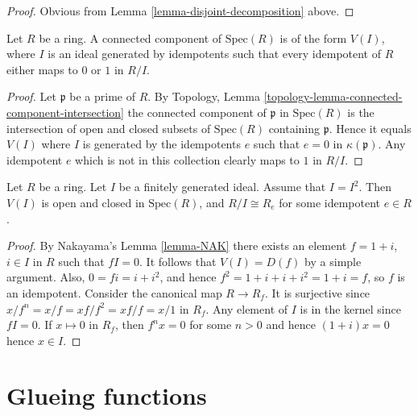 \begin{proof}
Obvious from Lemma \ref{lemma-disjoint-decomposition} above.
\end{proof}

\begin{lemma}
\label{lemma-connected-component}
Let $R$ be a ring. A connected component of
$\text{Spec}(R)$ is of the form $V(I)$,
where $I$ is an ideal generated by idempotents
such that every idempotent of $R$ either maps to
$0$ or $1$ in $R/I$.
\end{lemma}

\begin{proof}
Let $\mathfrak p$ be a prime of $R$.
By Topology, Lemma \ref{topology-lemma-connected-component-intersection}
the connected component of $\mathfrak p$ in $\text{Spec}(R)$
is the intersection of open and closed subsets of $\text{Spec}(R)$
containing $\mathfrak p$. 
Hence it equals $V(I)$ where
$I$ is generated by the idempotents $e$ such that $e = 0$
in $\kappa(\mathfrak p)$. Any idempotent $e$ which is not in
this collection clearly maps to $1$ in $R/I$.
\end{proof}

\begin{lemma}
\label{lemma-ideal-is-squared-union-connected}
Let $R$ be a ring.
Let $I$ be a finitely generated ideal.
Assume that $I = I^2$. 
Then $V(I)$ is open and closed in $\text{Spec}(R)$,
and $R/I \cong R_e$ for some idempotent $e \in R$.
\end{lemma}

\begin{proof}
By Nakayama's Lemma \ref{lemma-NAK} there exists an element
$f = 1 + i$, $i \in I$ in $R$ such that $fI = 0$.
It follows that $V(I) = D(f)$ by a simple argument.
Also, $0 = fi = i + i^2$, and hence
$f^2 = 1 + i + i + i^2 = 1 + i = f$, so $f$ is an idempotent.
Consider the canonical map $R \to R_f$. It is surjective
since $x/f^n = x/f = xf/f^2 = xf/f = x/1$ in $R_f$.
Any element of $I$ is in the kernel since $fI = 0$.
If $x \mapsto 0$ in $R_f$, then $f^nx = 0$ for some $n > 0$
and hence $(1 + i)x = 0$ hence $x \in I$.
\end{proof}















\section{Glueing functions}
\label{section-tilde-module-sheaf}


